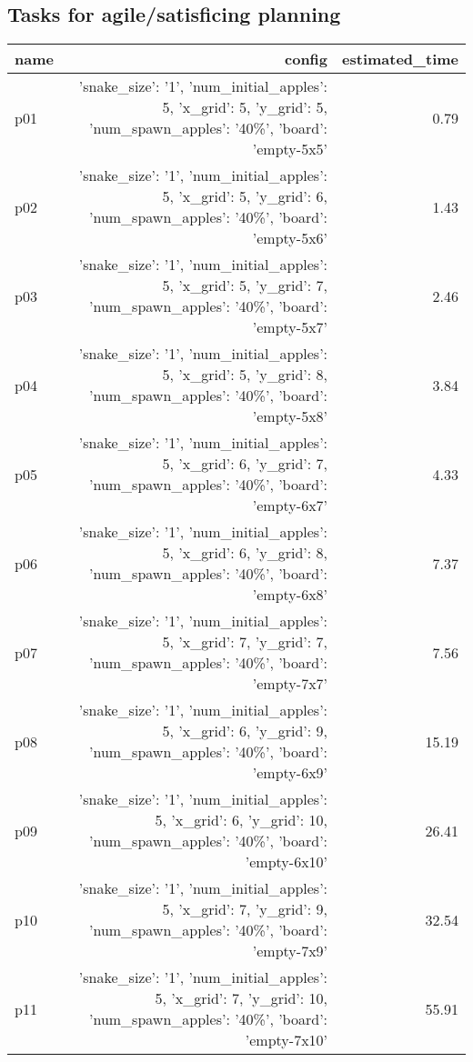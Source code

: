 \documentclass{article}
\begin{document}
                                \subsection*{Tasks for agile/satisficing planning}
                                
                            \begin{center}
                            \scriptsize
                            \begin{tabular}{@{}l|r|r@{}}
                            name & config & estimated\_time\\\midrule
                              p01&{'snake\_size': '1', 'num\_initial\_apples': 5, 'x\_grid': 5, 'y\_grid': 5, 'num\_spawn\_apples': '40\%', 'board': 'empty-5x5'}&0.79\\
  p02&{'snake\_size': '1', 'num\_initial\_apples': 5, 'x\_grid': 5, 'y\_grid': 6, 'num\_spawn\_apples': '40\%', 'board': 'empty-5x6'}&1.43\\
  p03&{'snake\_size': '1', 'num\_initial\_apples': 5, 'x\_grid': 5, 'y\_grid': 7, 'num\_spawn\_apples': '40\%', 'board': 'empty-5x7'}&2.46\\
  p04&{'snake\_size': '1', 'num\_initial\_apples': 5, 'x\_grid': 5, 'y\_grid': 8, 'num\_spawn\_apples': '40\%', 'board': 'empty-5x8'}&3.84\\
  p05&{'snake\_size': '1', 'num\_initial\_apples': 5, 'x\_grid': 6, 'y\_grid': 7, 'num\_spawn\_apples': '40\%', 'board': 'empty-6x7'}&4.33\\
  p06&{'snake\_size': '1', 'num\_initial\_apples': 5, 'x\_grid': 6, 'y\_grid': 8, 'num\_spawn\_apples': '40\%', 'board': 'empty-6x8'}&7.37\\
  p07&{'snake\_size': '1', 'num\_initial\_apples': 5, 'x\_grid': 7, 'y\_grid': 7, 'num\_spawn\_apples': '40\%', 'board': 'empty-7x7'}&7.56\\
  p08&{'snake\_size': '1', 'num\_initial\_apples': 5, 'x\_grid': 6, 'y\_grid': 9, 'num\_spawn\_apples': '40\%', 'board': 'empty-6x9'}&15.19\\
  p09&{'snake\_size': '1', 'num\_initial\_apples': 5, 'x\_grid': 6, 'y\_grid': 10, 'num\_spawn\_apples': '40\%', 'board': 'empty-6x10'}&26.41\\
  p10&{'snake\_size': '1', 'num\_initial\_apples': 5, 'x\_grid': 7, 'y\_grid': 9, 'num\_spawn\_apples': '40\%', 'board': 'empty-7x9'}&32.54\\
  p11&{'snake\_size': '1', 'num\_initial\_apples': 5, 'x\_grid': 7, 'y\_grid': 10, 'num\_spawn\_apples': '40\%', 'board': 'empty-7x10'}&55.91\\

\end{tabular}
\end{center}
\end{document}
